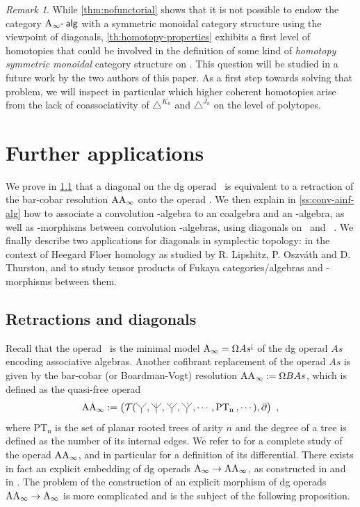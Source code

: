 \documentclass[twoside, 11pt]{amsart}
\theoremstyle{remark}
\newtheorem{remark}[definition]{\sc Remark}
\begin{document}
\begin{remark}
While \cref{thm:nofunctorial} shows that it is not possible to endow the category $\mathrm{A}_\infty\text{-\hspace{2pt}}\mathsf{alg}$ with a symmetric monoidal category structure using the viewpoint of diagonals, \cref{th:homotopy-properties} exhibits a first level of homotopies that could be involved in the definition of some kind of \textit{homotopy symmetric monoidal} category structure on \Aalg . 
This question will be studied in a future work by the two authors of this paper. As a first step towards solving that problem, we will inspect in particular which higher coherent homotopies arise from the lack of coassociativity of $\triangle^{K_n}$ and $\triangle^{J_n}$ on the level of polytopes. 
\end{remark}


\section{Further applications} \label{sec:V}

We prove in \cref{ss:retract-diag} that a diagonal on the dg operad \Ainf\ is equivalent to a retraction of the bar-cobar resolution $\mathrm{AA}_\infty$ onto the operad \Ainf . 
We then explain in \cref{ss:conv-ainf-alg} how to associate a convolution \Ainf -algebra to an \Ainf coalgebra and an \Ainf -algebra, as well as \Ainf -morphisms between convolution \Ainf -algebras, using diagonals on \Ainf\ and \Minf \ .
We finally describe two applications for diagonals in symplectic topology: in the context of Heegard Floer homology as studied by R. Lipshitz, P. Oszv\'ath and D. Thurston, and to study tensor products of Fukaya categories/algebras and \Ainf -morphisms between them.

\subsection{Retractions and diagonals} \label{ss:retract-diag}

Recall that the operad \Ainf\ is the minimal model $\mathrm{A}_\infty =\Omega As^{\text{!`}}$ of the dg operad $As$ encoding associative algebras. 
Another cofibrant replacement of the operad $As$ is given by the bar-cobar (or Boardman-Vogt) resolution $\mathrm{AA}_\infty := \Omega B As$, which is defined as the quasi-free operad 
\[ \AAinf := \left( \mathcal{T} (\premiertermecobarbarA , \premiertermecobarbarD , \premiertermecobarbarB , \premiertermecobarbarC , \cdots , \mathrm{PT_n} \text{\hspace{2pt}}, \cdots ) , \partial \right) \ , \] 
where $\mathrm{PT_n}$ is the set of planar rooted trees of arity $n$ and the degree of a tree is defined as the number of its internal edges.
We refer to \cite[Section 9.3]{LodayVallette12} for a complete study of the operad $\mathrm{AA}_\infty$, and in particular for a definition of its differential.
There exists in fact an explicit embedding of dg operads $\mathrm{A}_\infty \rightarrow \mathrm{AA}_\infty$, as constructed in \cite[Section 4]{MarklShnider06} and in \cite[Section 1.3.1.5]{mazuir-I}.
The problem of the construction of an explicit morphism of dg operads $\mathrm{AA}_\infty \rightarrow \mathrm{A}_\infty$ is more complicated and is the subject of the following proposition. 
\end{document}
